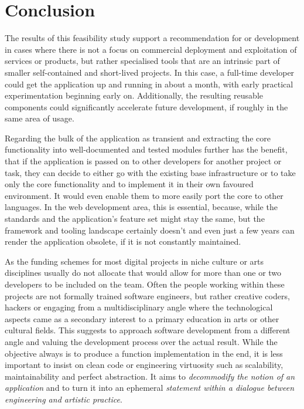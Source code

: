 \chapter{Conclusion}

The results of this feasibility study support a recommendation for  or  development in cases where there is not a focus on commercial deployment and exploitation of services or products, but rather specialised tools that are an intrinsic part of smaller self-contained and short-lived projects.
In this case, a full-time developer could get the application up and running in about a month, with early practical experimentation beginning early on.
Additionally, the resulting reusable components could significantly accelerate future development, if roughly in the same area of usage.

Regarding the bulk of the application as transient and extracting the core functionality into well-documented and tested modules further has the benefit, that if the application is passed on to other developers for another project or task, they can decide to either go with the existing base infrastructure or to take only the core functionality and to implement it in their own favoured environment.
It would even enable them to more easily port the core to other languages. In the web development area, this is essential, because, while the standards and the application's feature set might stay the same, but the framework and tooling landscape certainly doesn't and even just a few years can render the application obsolete, if it is not constantly maintained.

As the funding schemes for most digital projects in niche culture or arts disciplines usually do not allocate that would allow for more than one or two developers to be included on the team.
Often the people working within these projects are not formally trained software engineers, but rather creative coders, hackers or engaging from a multidisciplinary angle where the technological aspects came as a secondary interest to a primary education in arts or other cultural fields.
This suggests to approach software development from a different angle and valuing the development process over the actual result.
While the objective always is to produce a function implementation in the end, it is less important to insist on clean code or engineering virtuosity such as scalability, maintainability and perfect abstraction.
It aims to \emph{decommodify the notion of an application} and to turn it into an ephemeral \emph{statement within a dialogue between engineering and artistic practice}.

